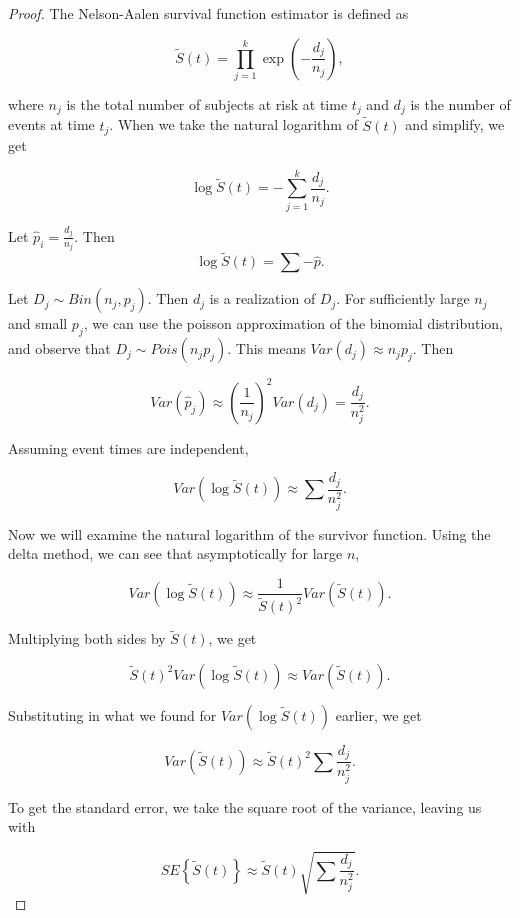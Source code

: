 \documentclass{article}
\begin{document}
	\begin{proof}
		The Nelson-Aalen survival function estimator is defined as 

		\[ \tilde{S}(t) = \prod_{j=1}^k \exp{\left(-\frac{d_j}{n_j}\right)}, \]
		
		where $n_j$ is the total number of subjects at risk at time $t_j$ and $d_j$ is the number of events at time $t_j$. When we take the natural logarithm of $\tilde{S}(t)$ and simplify, we get 

		\[ \log \tilde{S}(t) = -\sum_{j=1}^k \frac{d_j}{n_j}. \]

		Let $\hat p_i = \frac{d_j}{n_j}$. Then
		\[\log \tilde{S}(t) = \sum - \hat p.\]

		Let $D_j \sim Bin(n_j, p_j)$. Then $d_j$ is a realization of $D_j$. For sufficiently large $n_j$ and small $p_j$, we can use the poisson approximation of the binomial distribution, and observe that $D_j \sim Pois(n_jp_j)$. This means $Var(d_j) \approx n_j p_j $. Then

		\[Var(\hat{p}_j) \approx \left(\frac{1}{n_j} \right)^2 Var(d_j) = \frac{d_j}{n_j^2}.\]

		Assuming event times are independent,

		\[Var(\log \tilde{S}(t)) \approx \sum \frac{d_j}{n_j^2}.\]

		Now we will examine the natural logarithm of the survivor function. Using the delta method, we can see that asymptotically for large $n$,

		\[Var(\log \tilde{S}(t)) \approx \frac{1}{\tilde{S}(t)^2} Var(\tilde{S}(t)). \]

		Multiplying both sides by $\tilde{S}(t)$, we get

		\[\tilde{S}(t)^2 Var(\log \tilde{S}(t)) \approx Var(\tilde{S}(t)).\]

		Substituting in what we found for $Var(\log \tilde{S}(t))$ earlier, we get

		\[Var(\tilde{S}(t)) \approx \tilde{S}(t)^2 \sum \frac{d_j}{n_j^2}.\]

		To get the standard error, we take the square root of the variance, leaving us with

		\[SE\left\{ \tilde{S}(t) \right\} \approx \tilde{S}(t) \sqrt{\sum \frac{d_j}{n_j^2}}. \]






	\end{proof}
\end{document}
